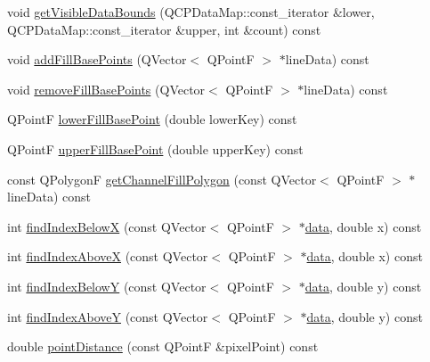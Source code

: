 \begin{DoxyCompactItemize}
\item 
void \hyperlink{class_q_c_p_graph_a8963c90087cf53b889b29dd59aa41aad}{get\-Visible\-Data\-Bounds} (Q\-C\-P\-Data\-Map\-::const\-\_\-iterator \&lower, Q\-C\-P\-Data\-Map\-::const\-\_\-iterator \&upper, int \&count) const 
\item 
void \hyperlink{class_q_c_p_graph_a5fa7884620d7c54b81dfbd255d97b636}{add\-Fill\-Base\-Points} (Q\-Vector$<$ Q\-Point\-F $>$ $\ast$line\-Data) const 
\item 
void \hyperlink{class_q_c_p_graph_ad31b49a90e91e538fd9caf011c913a68}{remove\-Fill\-Base\-Points} (Q\-Vector$<$ Q\-Point\-F $>$ $\ast$line\-Data) const 
\item 
Q\-Point\-F \hyperlink{class_q_c_p_graph_a41f982e8ceaefe6a53eb7432f26d64b6}{lower\-Fill\-Base\-Point} (double lower\-Key) const 
\item 
Q\-Point\-F \hyperlink{class_q_c_p_graph_a363d066c179e0f46cc93c12bafb0bfba}{upper\-Fill\-Base\-Point} (double upper\-Key) const 
\item 
const Q\-Polygon\-F \hyperlink{class_q_c_p_graph_a0374b7268e35cab9802a6be2b5d726d7}{get\-Channel\-Fill\-Polygon} (const Q\-Vector$<$ Q\-Point\-F $>$ $\ast$line\-Data) const 
\item 
int \hyperlink{class_q_c_p_graph_a6f4e9461d5925be9228fc4760249a04f}{find\-Index\-Below\-X} (const Q\-Vector$<$ Q\-Point\-F $>$ $\ast$\hyperlink{class_q_c_p_graph_a8f4c17d993df4759c7426db45b33fbc0}{data}, double x) const 
\item 
int \hyperlink{class_q_c_p_graph_abab2a75b5e63630432bdd1f3b57f07fa}{find\-Index\-Above\-X} (const Q\-Vector$<$ Q\-Point\-F $>$ $\ast$\hyperlink{class_q_c_p_graph_a8f4c17d993df4759c7426db45b33fbc0}{data}, double x) const 
\item 
int \hyperlink{class_q_c_p_graph_a6c4d556de3d1e02f548401001f72c6ff}{find\-Index\-Below\-Y} (const Q\-Vector$<$ Q\-Point\-F $>$ $\ast$\hyperlink{class_q_c_p_graph_a8f4c17d993df4759c7426db45b33fbc0}{data}, double y) const 
\item 
int \hyperlink{class_q_c_p_graph_adf50243f1df203883a2187089734bfcb}{find\-Index\-Above\-Y} (const Q\-Vector$<$ Q\-Point\-F $>$ $\ast$\hyperlink{class_q_c_p_graph_a8f4c17d993df4759c7426db45b33fbc0}{data}, double y) const 
\item 
double \hyperlink{class_q_c_p_graph_af93762a12a481a7edb4b3dd9e330dff1}{point\-Distance} (const Q\-Point\-F \&pixel\-Point) const 
\end{DoxyCompactItemize}
